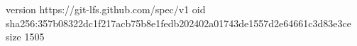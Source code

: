 version https://git-lfs.github.com/spec/v1
oid sha256:357b08322dc1f217acb75b8e1fedb202402a01743de1557d2e64661c3d83e3ce
size 1505

